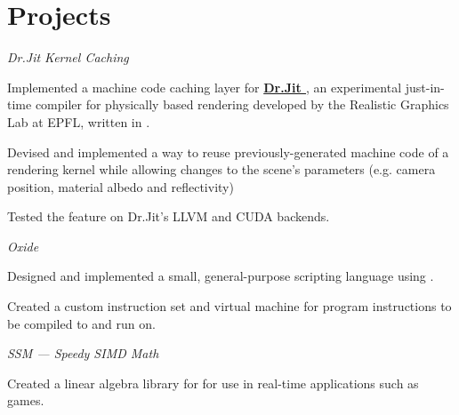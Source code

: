 \section*{Projects}
\begin{cventries}
  {\textit{Dr.Jit Kernel Caching}}
  {}
  {}
  {%
    \begin{cvitems}
	\item Implemented a machine code caching layer for \textbf{\href{https://rgl.epfl.ch/publications/Jakob2022DrJit}{Dr.Jit \faExternalLink*}}, an experimental just-in-time compiler for physically based rendering developed by the Realistic Graphics Lab at EPFL, written in .
		\item Devised and implemented a way to reuse previously-generated machine code of a rendering kernel while allowing changes to the scene's parameters (e.g. camera position, material albedo and reflectivity)
		\item Tested the feature on Dr.Jit's LLVM and CUDA backends.
    \end{cvitems}
  }
  {\textit{Oxide}}
  {}
  {}
  {%
    \begin{cvitems}
    \item Designed and implemented a small, general-purpose scripting language using .\textbf{}
    \item Created a custom instruction set and virtual machine for program instructions to be compiled to and run on.
    \end{cvitems}
  }
  {\textit{SSM --- Speedy SIMD Math}}
  {}
  {}
  {%
    \begin{cvitems}
    \item Created a linear algebra library for  for use in real-time applications such as games.\textbf{}

\end{cvitems}}
\end{cventries}
